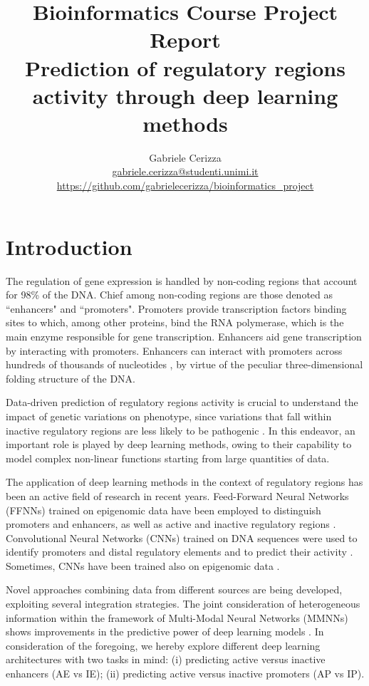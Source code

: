 \documentclass{article}
\title{%
    \textbf{Bioinformatics Course Project Report}\\
    \vspace{1em}
    Prediction of regulatory regions activity through deep learning methods
}
\author{%
    Gabriele Cerizza\\
    \url{gabriele.cerizza@studenti.unimi.it}\\
    \url{https://github.com/gabrielecerizza/bioinformatics_project}
}
\date{}
\begin{document}
\maketitle

\section{Introduction}

The regulation of gene expression is handled by non-coding regions that account for 98\% of the DNA. Chief among non-coding regions are those denoted as  “enhancers" and  “promoters". Promoters provide transcription factors binding sites to which, among other proteins, bind the RNA polymerase, which is the main enzyme responsible for gene transcription. Enhancers aid gene transcription by interacting with promoters. Enhancers can interact with promoters across hundreds of thousands of nucleotides \cite{kelley18}, by virtue of the peculiar three-dimensional folding structure of the DNA.   

Data-driven prediction of regulatory regions activity is crucial to understand the impact of genetic variations on phenotype, since variations that fall within inactive regulatory regions are less likely to be pathogenic \cite{cappelletti20}. In this endeavor, an important role is played by deep learning methods, owing to their capability to model complex non-linear functions starting from large quantities of data.

The application of deep learning methods in the context of regulatory regions has been an active field of research in recent years. Feed-Forward Neural Networks (FFNNs) trained on epigenomic data have been employed to distinguish promoters and enhancers, as well as active and inactive regulatory regions \cite{li_wasserman18, cappelletti20}. Convolutional Neural Networks (CNNs) trained on DNA sequences were used to identify promoters and distal regulatory elements \cite{min17, kelley18, cappelletti20, onimaru20, chen21} and to predict their activity \cite{cappelletti20}. Sometimes, CNNs have been trained also on epigenomic data \cite{chen21, chen_zhang21}.

Novel approaches combining data from different sources are being developed, exploiting several integration strategies. The joint consideration of heterogeneous information within the framework of Multi-Modal Neural Networks (MMNNs) shows improvements in the predictive power of deep learning models \cite{choi19, li_wu16}. 
In consideration of the foregoing, we hereby explore different deep learning architectures with two tasks in mind: (i) predicting active versus inactive enhancers (AE vs IE); (ii) predicting active versus inactive promoters (AP vs IP).
\end{document}
